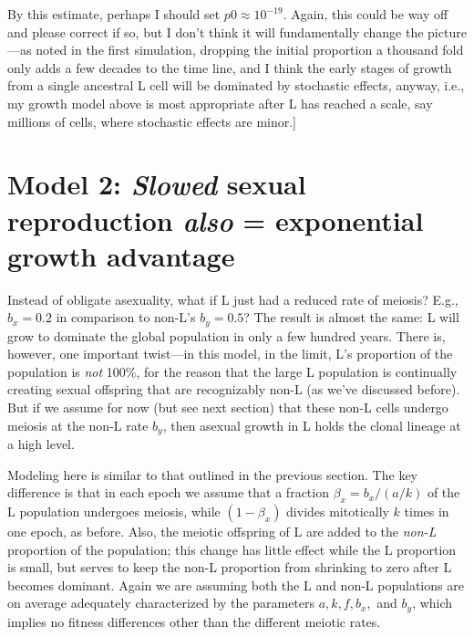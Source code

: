 \documentclass{article}\usepackage[]{graphicx}\usepackage[]{color}
\begin{document}
By this estimate, perhaps I should set $p0\approx 10^{-19}$. Again, this could be way off and please
correct if so, but I don't think it will fundamentally change the picture---as noted in the first
simulation, dropping the initial proportion a thousand fold only adds a few decades to the time
line, and I think the early stages of growth from a single ancestral L cell will be dominated by
stochastic effects, anyway, i.e., my growth model above is most appropriate after L has reached a
scale, say millions of cells, where stochastic effects are minor.]

\section{Model 2: \textit{Slowed} sexual reproduction \textit{also} = exponential growth advantage}
\label{sec:slowexpo}

Instead of obligate asexuality, what if L just had a reduced rate of meiosis?  E.g., $b_x=0.2$ in
comparison to non-L's $b_y=0.5$?  The result is almost the same: L will grow to dominate the global
population in only a few hundred years.  There is, however, one important twist---in this model, in
the limit, L's proportion of the population is \textit{not} 100\%, for the reason that the large L
population is continually creating sexual offspring that are recognizably non-L (as we've discussed
before).  But if we assume for now (but see next section) that these non-L cells undergo meiosis at
the non-L rate $b_y$, then asexual growth in L holds the clonal lineage at a high level.

Modeling here is similar to that outlined in the previous section.  The key difference is that in
each epoch we assume that a fraction $\beta_x = b_x/(a/k)$ of the L population undergoes meiosis,
while $(1-\beta_x)$ divides mitotically $k$ times in one epoch, as before.  Also, the meiotic
offspring of L are added to the \textit{non-L} proportion of the population; this change has little
effect while the L proportion is small, but serves to keep the non-L proportion from shrinking to
zero after L becomes dominant.  Again we are assuming both the L and non-L populations are on
average adequately characterized by the parameters $a,k,f,b_x,$ and $b_y$, which implies no fitness
differences other than the different meiotic rates.
\end{document}
